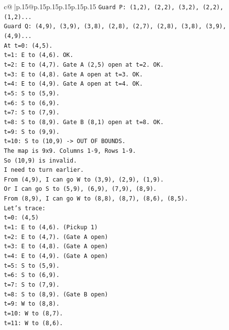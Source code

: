 \documentclass{article}
\begin{document}
{\begin{supertabular}{c@{$\;$}|p{.15\linewidth}@{}p{.15\linewidth}p{.15\linewidth}p{.15\linewidth}p{.15\linewidth}p{.15\linewidth}}
{{{\texttt{Guard P: (1,2), (2,2), (3,2), (2,2), (1,2)...} \\
\texttt{Guard Q: (4,9), (3,9), (3,8), (2,8), (2,7), (2,8), (3,8), (3,9), (4,9)...} \\
\texttt{At t=0: (4,5).} \\
\texttt{t=1: E to (4,6). OK.} \\
\texttt{t=2: E to (4,7). Gate A (2,5) open at t=2. OK.} \\
\texttt{t=3: E to (4,8). Gate A open at t=3. OK.} \\
\texttt{t=4: E to (4,9). Gate A open at t=4. OK.} \\
\texttt{t=5: S to (5,9).} \\
\texttt{t=6: S to (6,9).} \\
\texttt{t=7: S to (7,9).} \\
\texttt{t=8: S to (8,9). Gate B (8,1) open at t=8. OK.} \\
\texttt{t=9: S to (9,9).} \\
\texttt{t=10: S to (10,9) {-}> OUT OF BOUNDS.} \\
\texttt{The map is 9x9. Columns 1{-}9, Rows 1{-}9.} \\
\texttt{So (10,9) is invalid.} \\
\texttt{I need to turn earlier.} \\
\texttt{From (4,9), I can go W to (3,9), (2,9), (1,9).} \\
\texttt{Or I can go S to (5,9), (6,9), (7,9), (8,9).} \\
\texttt{From (8,9), I can go W to (8,8), (8,7), (8,6), (8,5).} \\
\texttt{Let's trace:} \\
\texttt{t=0: (4,5)} \\
\texttt{t=1: E to (4,6). (Pickup 1)} \\
\texttt{t=2: E to (4,7). (Gate A open)} \\
\texttt{t=3: E to (4,8). (Gate A open)} \\
\texttt{t=4: E to (4,9). (Gate A open)} \\
\texttt{t=5: S to (5,9).} \\
\texttt{t=6: S to (6,9).} \\
\texttt{t=7: S to (7,9).} \\
\texttt{t=8: S to (8,9). (Gate B open)} \\
\texttt{t=9: W to (8,8).} \\
\texttt{t=10: W to (8,7).} \\
\texttt{t=11: W to (8,6).} \\
}}}
\end{supertabular}}
\end{document}
